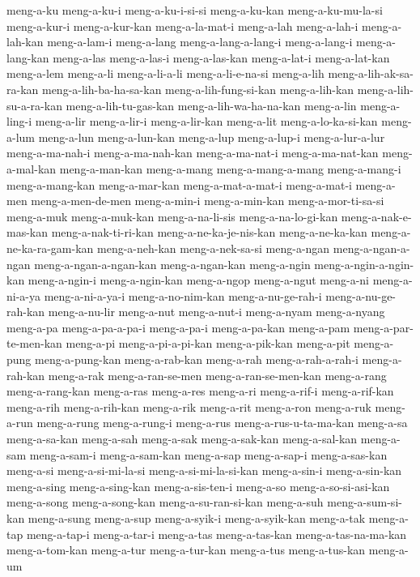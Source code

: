 {meng-a-ku meng-a-ku-i meng-a-ku-i-si-si meng-a-ku-kan meng-a-ku-mu-la-si
meng-a-kur-i meng-a-kur-kan meng-a-la-mat-i meng-a-lah meng-a-lah-i
meng-a-lah-kan meng-a-lam-i meng-a-lang meng-a-lang-a-lang-i meng-a-lang-i
meng-a-lang-kan meng-a-las meng-a-las-i meng-a-las-kan meng-a-lat-i
meng-a-lat-kan meng-a-lem meng-a-li meng-a-li-a-li meng-a-li-e-na-si
meng-a-lih meng-a-lih-ak-sa-ra-kan meng-a-lih-ba-ha-sa-kan
meng-a-lih-fung-si-kan meng-a-lih-kan meng-a-lih-su-a-ra-kan
meng-a-lih-tu-gas-kan meng-a-lih-wa-ha-na-kan meng-a-lin meng-a-ling-i
meng-a-lir meng-a-lir-i meng-a-lir-kan meng-a-lit meng-a-lo-ka-si-kan
meng-a-lum meng-a-lun meng-a-lun-kan meng-a-lup meng-a-lup-i
meng-a-lur-a-lur meng-a-ma-nah-i meng-a-ma-nah-kan meng-a-ma-nat-i
meng-a-ma-nat-kan meng-a-mal-kan meng-a-man-kan meng-a-mang
meng-a-mang-a-mang meng-a-mang-i meng-a-mang-kan meng-a-mar-kan
meng-a-mat-a-mat-i meng-a-mat-i meng-a-men meng-a-men-de-men meng-a-min-i
meng-a-min-kan meng-a-mor-ti-sa-si meng-a-muk meng-a-muk-kan
meng-a-na-li-sis meng-a-na-lo-gi-kan meng-a-nak-e-mas-kan
meng-a-nak-ti-ri-kan meng-a-ne-ka-je-nis-kan meng-a-ne-ka-kan
meng-a-ne-ka-ra-gam-kan meng-a-neh-kan meng-a-nek-sa-si meng-a-ngan
meng-a-ngan-a-ngan meng-a-ngan-a-ngan-kan meng-a-ngan-kan meng-a-ngin
meng-a-ngin-a-ngin-kan meng-a-ngin-i meng-a-ngin-kan meng-a-ngop
meng-a-ngut meng-a-ni meng-a-ni-a-ya meng-a-ni-a-ya-i meng-a-no-nim-kan
meng-a-nu-ge-rah-i meng-a-nu-ge-rah-kan meng-a-nu-lir meng-a-nut
meng-a-nut-i meng-a-nyam meng-a-nyang meng-a-pa meng-a-pa-a-pa-i
meng-a-pa-i meng-a-pa-kan meng-a-pam meng-a-par-te-men-kan meng-a-pi
meng-a-pi-a-pi-kan meng-a-pik-kan meng-a-pit meng-a-pung meng-a-pung-kan
meng-a-rab-kan meng-a-rah meng-a-rah-a-rah-i meng-a-rah-kan meng-a-rak
meng-a-ran-se-men meng-a-ran-se-men-kan meng-a-rang meng-a-rang-kan
meng-a-ras meng-a-res meng-a-ri meng-a-rif-i meng-a-rif-kan meng-a-rih
meng-a-rih-kan meng-a-rik meng-a-rit meng-a-ron meng-a-ruk meng-a-run
meng-a-rung meng-a-rung-i meng-a-rus meng-a-rus-u-ta-ma-kan meng-a-sa
meng-a-sa-kan meng-a-sah meng-a-sak meng-a-sak-kan meng-a-sal-kan
meng-a-sam meng-a-sam-i meng-a-sam-kan meng-a-sap meng-a-sap-i
meng-a-sas-kan meng-a-si meng-a-si-mi-la-si meng-a-si-mi-la-si-kan
meng-a-sin-i meng-a-sin-kan meng-a-sing meng-a-sing-kan meng-a-sis-ten-i
meng-a-so meng-a-so-si-asi-kan meng-a-song meng-a-song-kan
meng-a-su-ran-si-kan meng-a-suh meng-a-sum-si-kan meng-a-sung meng-a-sup
meng-a-syik-i meng-a-syik-kan meng-a-tak meng-a-tap meng-a-tap-i
meng-a-tar-i meng-a-tas meng-a-tas-kan meng-a-tas-na-ma-kan meng-a-tom-kan
meng-a-tur meng-a-tur-kan meng-a-tus meng-a-tus-kan meng-a-um
}
